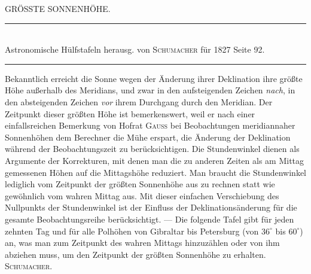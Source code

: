 \clearpage
{}
\hypertarget{native-465-sunheight}{}
\begin{center}{\large GRÖSSTE SONNENHÖHE.}\end{center}

\begin{center}
\rule{0.55\linewidth}{0.4pt}\\[2pt]
Astronomische Hülfstafeln herausg. von \textsc{Schumacher} für 1827 Seite 92.\\[2pt]
\rule{0.55\linewidth}{0.4pt}
\end{center}

Bekanntlich erreicht die Sonne wegen der Änderung ihrer Deklination ihre größte Höhe außerhalb des Meridians, und zwar in den aufsteigenden Zeichen \emph{nach}, in den absteigenden Zeichen \emph{vor} ihrem Durchgang durch den Meridian. Der Zeitpunkt dieser größten Höhe ist bemerkenswert, weil er nach einer einfallsreichen Bemerkung von Hofrat \textsc{Gauss} bei Beobachtungen
meridiannaher Sonnenhöhen dem Berechner die Mühe erspart, die Änderung der Deklination während der Beobachtungszeit zu berücksichtigen. Die Stundenwinkel dienen als Argumente der Korrekturen, mit denen man die zu anderen Zeiten als am Mittag gemessenen Höhen auf die Mittagshöhe reduziert. Man braucht die Stundenwinkel lediglich vom Zeitpunkt der größten Sonnenhöhe aus zu rechnen statt wie gewöhnlich vom wahren Mittag aus. Mit dieser einfachen Verschiebung des Nullpunkts der Stundenwinkel ist der Einfluss der Deklinationsänderung für die gesamte Beobachtungsreihe berücksichtigt. --- Die folgende Tafel gibt für jeden zehnten Tag und für alle Polhöhen von Gibraltar bis Petersburg (von $36^\circ$ bis $60^\circ$) an, was man zum Zeitpunkt des wahren Mittags hinzuzählen oder von ihm abziehen muss, um den Zeitpunkt der größten Sonnenhöhe zu erhalten. \textsc{Schumacher.}
